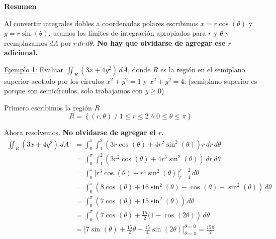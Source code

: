 \documentclass[12pt]{article}
\begin{document}
\vspace{0.2cm}
\vspace{0.2cm}

\textbf{Resumen}

Al convertir integrales dobles a coordenadas polares escribimos $ x=r\cos^{}(\theta) $ y $ y=r\sin^{}(\theta) $, usamos los límites de integración apropiados para $ r $ y $ \theta $ y reemplazamos $ dA $ por $ r\,dr\,d\theta $. \textbf{No hay que olvidarse de agregar ese $ r $ adicional.}

\underline{Ejemplo 1:} Evaluar $ \iint_{R} \left(3x+4y^2\right) \,dA $, donde $ R $ es la región en el semiplano superior acotado por los círculos $ x^2+y^2=1 $ y $ x^2+y^2=4 $. (semiplano superior es porque son semicírculos, solo trabajamos con $ y\geq 0 $)

Primero escribimos la región $ R $
\[
  R=\left\{(r,\theta) \;/\; 1\leq r\leq 2 \land 0\leq \theta\leq \pi\right\}
\]

Ahora resolvemos. \textbf{No olvidarse de agregar el $ r $}.
\begin{align*}
	\iint_{R} \left(3x+4y^2\right) \,dA &= \int_{0}^{\pi} \int_{1}^{2} \left(3r\cos^{}(\theta)+4r^2\sin^{2}(\theta)\right)r \,dr\,d\theta\\
	 &= \int_{0}^{\pi} \int_{1}^{2} \left(3r^2\cos^{}(\theta)+4r^3\sin^{2}(\theta)\right) \,dr\,d\theta\\
	 &= \int_{0}^{\pi} \Bigg[r^3\cos^{}(\theta)+r^4\sin^{2}(\theta)\Bigg]_{r=1}^{r=2} \,d\theta\\
	 &= \int_{0}^{\pi} \left(8\cos^{}(\theta)+16\sin^{2}(\theta)-\cos^{}(\theta)-\sin^{2}(\theta)\right) \,d\theta\\
	 &= \int_{0}^{\pi} \left(7\cos^{}(\theta)+15\sin^{2}(\theta)\right) \,d\theta\\
	 &= \int_{0}^{\pi} \left(7\cos^{}(\theta)+\frac{15}{2}(1-\cos^{}(2\theta)\right) \,d\theta\\
	 &= \Bigg[7\sin^{}(\theta)+\frac{15}{2}\theta-\frac{15}{4}\sin^{}(2\theta)\Bigg]_{\theta=\pi}^{\theta=0}=\frac{15\pi}{2}
\end{align*}
\end{document}
